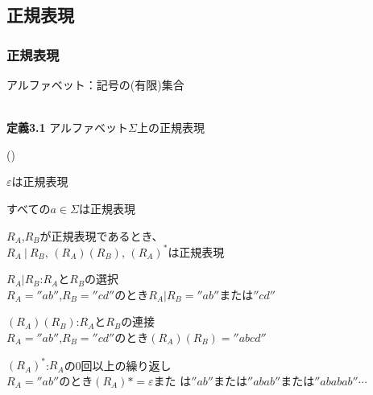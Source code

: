 \documentclass[ckj,dvipdfmx]{beamer}
\newcounter{coffee}
\begin{document}
\subsection{正規表現}

\begin{frame}
 \frametitle{正規表現}
 アルファベット：記号の(有限)集合\\
 \\
 \begin{screen}
  {\bf 定義3.1} アルファベット$\Sigma$上の正規表現
	\begin{list}{()}{}
	 \item $\varepsilon$は正規表現
	 \item すべての$a\in\Sigma$は正規表現
	 \item $R_A$,$R_B$が正規表現であるとき、\\
	       \qquad $R_A\ |\ R_B$,
	       $(R_A)(R_B)$, $(R_A)^\ast$は正規表現
	\end{list}
 \end{screen}
 {\scriptsize	
 \begin{list}{}{}
  \item $R_A|R_B$:$R_A$と$R_B$の選択\\
	$R_A=''ab''$,$R_B=''cd''$のとき$R_A|R_B=''ab''\mbox{または}''cd''$
  \item $(R_A)(R_B)$:$R_A$と$R_B$の連接\\
	$R_A=''ab''$,$R_B=''cd''$のとき$(R_A)(R_B)=''abcd''$
  \item $(R_A)^\ast$:$R_A$の0回以上の繰り返し\\
	$R_A=''ab''$のとき$(R_A)\ast=\varepsilon\mbox{また
	は}''ab''\mbox{または}''abab''\mbox{または}''ababab''\cdots$
 \end{list}
 }
\end{frame}
\end{document}
